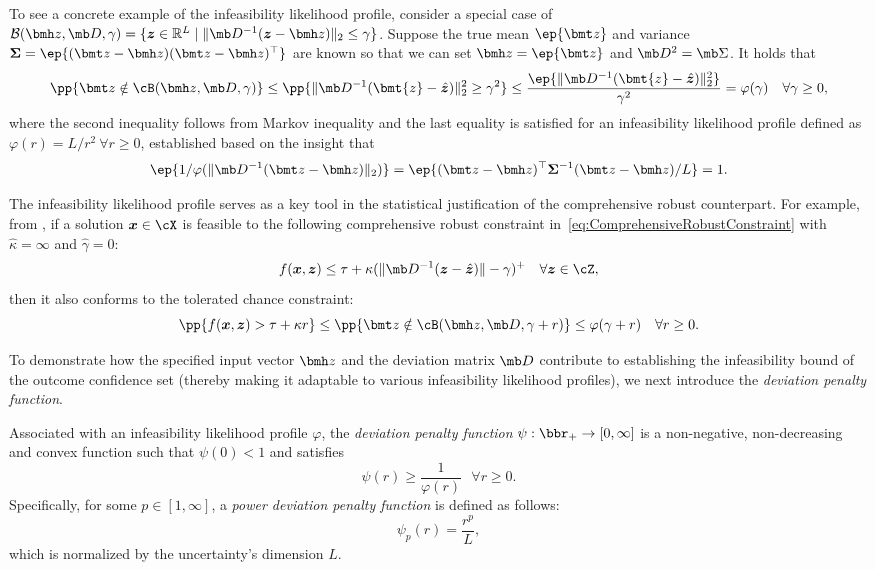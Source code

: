 \documentclass[opre, blindrev]{informs4}
\newcommand{\1}[1]{\mathds{1}{\left(#1\right)}}
\begin{document}
To see a concrete example of the infeasibility likelihood profile, consider a special case of $\mathcal{B}(\bmh z, \mb D, \gamma) = \{ \bm z \in \mathbb{R}^L \;|\; \| \mb D^{-1} (\bm z - \bmh z) \|_2 \leq \gamma \}$. Suppose the true mean $\ep{\bmt z}$ and variance $\bm \Sigma = \ep{(\bmt z - \bmh z)(\bmt z - \bmh z)^\top}$ are known so that we can set $\bmh z = \ep{\bmt z}$ and $\mb D^2 = \mb \Sigma$. It holds that
$$
\pp{\bmt z \notin \cB(\bmh z, \mb D, \gamma)} \leq  \pp{\|\mb D^{-1} (\bmt{z} - \hat{\bm{z}})\|^2_2 \geq \gamma^2} \leq \frac{\ep{\|\mb D^{-1} (\bmt{z} - \hat{\bm{z}})\|^2_2}}{\gamma^2} = \varphi(\gamma) ~~~\forall \gamma \geq 0,
$$
where the second inequality follows from Markov inequality and the last equality is satisfied for an infeasibility likelihood profile defined as $\varphi(r) = L/r^2 ~\forall r\geq 0$, established based on the insight that 
$$
\ep{1/ \varphi(\|\mb D^{-1}(\bmt z - \bmh z)\|_2) } = \ep{(\bmt z - \bmh z)^\top \bm \Sigma^{-1}(\bmt z - \bmh z)/L} = 1.
$$

The infeasibility likelihood profile serves as a key tool in the statistical justification of the comprehensive robust counterpart. For example, from , if a solution $\bm x \in \cX$ is feasible to the following comprehensive robust constraint in~\eqref{eq:ComprehensiveRobustConstraint} with $\hat \kappa = \infty$ and $\hat \gamma = 0$:
$$
f(\bm x,\bm z) \leq \tau + \kappa  (\|\mb D^{-1} (\bm{z} - \hat{\bm{z}})\| -\gamma)^+ ~~~\forall \bm z \in \cZ,
$$
then it also conforms to the tolerated chance constraint:
$$
\pp{f(\bm x,\bm z) > \tau + \kappa r} \leq \pp{\bmt z \notin \cB(\bmh z,\mb D, \gamma + r)} \leq \varphi(\gamma + r) \quad \forall r \geq 0.
$$

To demonstrate how the specified input vector $\bmh z$ and the deviation matrix $\mb D$ contribute to establishing the infeasibility bound of the outcome confidence set (thereby making it adaptable to various infeasibility likelihood profiles), we next introduce the \textit{deviation penalty function}. 

\begin{definition}
\textnormal{
Associated with an infeasibility likelihood profile $\varphi$, the \textit{deviation penalty function} $ \psi:\bbr_+ \rightarrow [0,\infty]$ is a non-negative, non-decreasing and convex function such that $\psi(0)<1$ and satisfies
$$
\psi(r) \geq \frac{1}{\varphi(r)} ~~~\forall r \geq 0.
$$
Specifically, for some $p \in [1,\infty]$, a \textit{power deviation penalty function} is defined as follows:
$$
\psi_p(r) = \frac{r^p}{L},
$$
which is normalized by the uncertainty's dimension $L$.
}
\end{definition}
\end{document}
